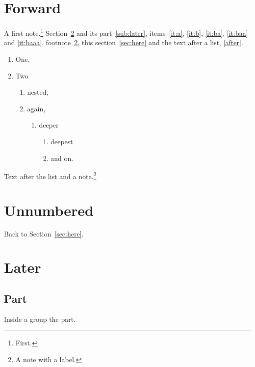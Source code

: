 \documentclass{article}
\begin{document}
\section{Forward}A first note.\footnote{First.}
Section~\ref{sec:later} and its part~\ref{sub:later}, items~\ref{it:a},
\ref{it:b}, \ref{it:ba}, \ref{it:baa} and \ref{it:baaa}, footnote~\ref{fn:one},
this section~\ref{sec:here} and the text after a list, \ref{after}.
\label{sec:here}
\begin{enumerate}
\item\label{it:a} One.
\item Two
  \begin{enumerate}
  \item\label{it:b} nested,
  \item\label{it:ba} again,
    \begin{enumerate}
    \item deeper
      \begin{enumerate}
      \item\label{it:baa} deepest
      \item\label{it:baaa} and on.
      \end{enumerate}
    \end{enumerate}
  \end{enumerate}
\end{enumerate}
Text after the list\label{after} and a note.\footnote{A note\label{fn:one} with a label.}
\section*{Unnumbered}
Back to Section~\ref{sec:here}.
\section{Later}\label{sec:later}
\subsection{Part}
{\small Inside a group\label{sub:later}} the part.
\end{document}
